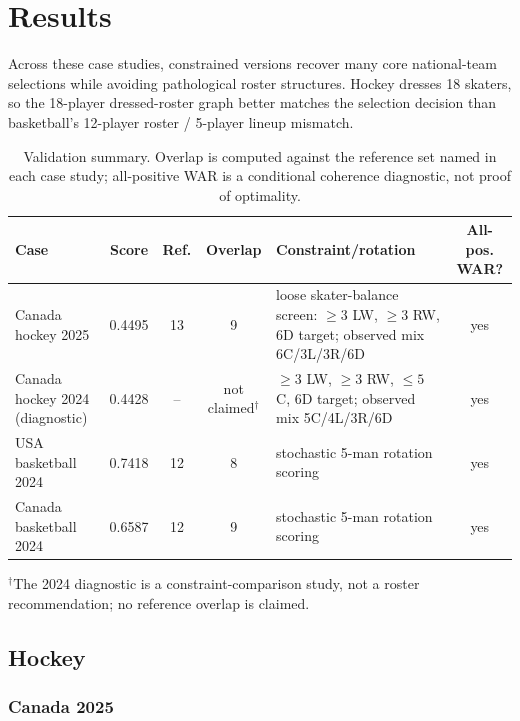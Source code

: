 \documentclass[12pt,letterpaper]{article}
\begin{document}
\section{Results}
\label{sec:results}

Across these case studies, constrained versions recover many core
national-team selections while avoiding pathological roster structures.
Hockey dresses 18 skaters, so the 18-player dressed-roster graph better
matches the selection decision than basketball's 12-player roster /
5-player lineup mismatch.

\begin{table}[h]
  \centering
  \caption{Validation summary. Overlap is computed against the reference
    set named in each case study; all-positive WAR is a conditional
    coherence diagnostic, not proof of optimality.}
  \label{tab:summary}
  \small
  \begin{tabular}{@{}l c c c p{4.8cm} c@{}}
    \toprule
    Case & Score & Ref. & Overlap & Constraint/rotation & All-pos. WAR? \\
    \midrule
    Canada hockey 2025 & 0.4495 & 13 & 9 &
      loose skater-balance screen: $\geq 3$ LW, $\geq 3$ RW, 6D target;
      observed mix 6C/3L/3R/6D & yes \\
    Canada hockey 2024 (diagnostic) & 0.4428 & -- & not claimed$^{\dagger}$ &
      $\geq 3$ LW, $\geq 3$ RW, $\leq 5$ C, 6D target;
      observed mix 5C/4L/3R/6D & yes \\
    USA basketball 2024 & 0.7418 & 12 & 8 &
      stochastic 5-man rotation scoring & yes \\
    Canada basketball 2024 & 0.6587 & 12 & 9 &
      stochastic 5-man rotation scoring & yes \\
    \bottomrule
  \end{tabular}
  \par\smallskip
  {\small $^{\dagger}$The 2024 diagnostic is a constraint-comparison study,
  not a roster recommendation; no reference overlap is claimed.}
\end{table}

\subsection{Hockey}

\subsubsection{Canada 2025}
\end{document}
